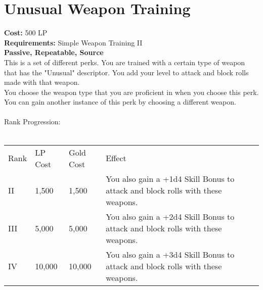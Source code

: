 \section{Unusual Weapon Training}\label{perk:unusualWeaponTraining}
\textbf{Cost:} 500 LP\\
\textbf{Requirements:} Simple Weapon Training II\\
\textbf{Passive, Repeatable, Source}\\
This is a set of different perks.
You are trained with a certain type of weapon that has the "Unusual" descriptor.
You add your level to attack and block rolls made with that weapon.\\
You choose the weapon type that you are proficient in when you choose this perk.
You can gain another instance of this perk by choosing a different weapon.\\
\\
Rank Progression:\\
\\
\begin{longtable}{l | l | l | p{9cm}}
	Rank & LP Cost & Gold Cost & Effect\\
	II & 1,500 & 1,500 & You also gain a +1d4 Skill Bonus to attack and block rolls with these weapons.\\
	III & 5,000 & 5,000 & You also gain a +2d4 Skill Bonus to attack and block rolls with these weapons.\\
	IV & 10,000 & 10,000 & You also gain a +3d4 Skill Bonus to attack and block rolls with these weapons.\\
\end{longtable}
